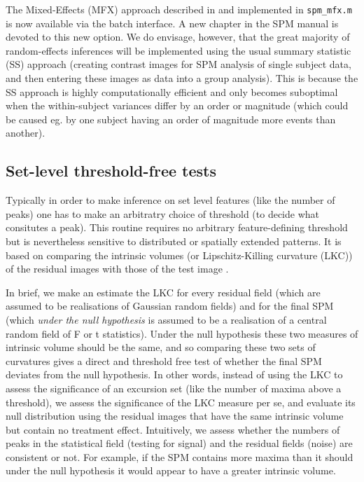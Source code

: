 \documentclass[a4paper,titlepage,openany]{article}
\begin{document}
The Mixed-Effects (MFX) approach described in \cite{karl_mixed} and implemented in \texttt{spm\_mfx.m} is now available via the batch interface. A new chapter in the SPM manual is devoted to this new option. We do envisage, however, that the great majority of random-effects inferences will be implemented using the usual summary statistic (SS) approach (creating contrast images for SPM analysis of single subject data, and then entering these images as data into a group analysis). This is because the SS approach is highly computationally efficient and only becomes suboptimal when the within-subject variances differ by an order or magnitude (which could be caused eg. by one subject having an order of magnitude more events than another).

\subsection{Set-level threshold-free tests}

Typically in order to make inference on set level features (like the number of peaks) one has to make an arbitratry choice of threshold (to decide what consitutes a peak). This routine requires no arbitrary feature-defining threshold but is nevertheless sensitive to distributed or spatially extended patterns. It is based on comparing the intrinsic volumes (or Lipschitz-Killing curvature (LKC)) of the residual images with those of the test image \cite{Barnes2013}.

In brief, we make an estimate the LKC for every residual field (which are assumed to be realisations of Gaussian random fields) and for the final SPM (which \emph{under the null hypothesis} is assumed to be a realisation of a central random field of F or t statistics). Under the null hypothesis these two measures of intrinsic volume should be the same, and so comparing these two sets of curvatures gives a direct and threshold free test of whether the final SPM deviates from the null hypothesis. In other words, instead of using the LKC to assess the significance of an excursion set (like the number of maxima above a threshold), we assess the significance of the LKC measure per se, and evaluate its null distribution using the residual images that have the same intrinsic volume but contain no treatment effect. Intuitively, we assess whether the numbers of peaks in the statistical field (testing for signal) and the residual fields (noise) are consistent or not. For example, if the SPM contains more maxima than it should under the null hypothesis it would appear to have a greater intrinsic volume.
\end{document}
